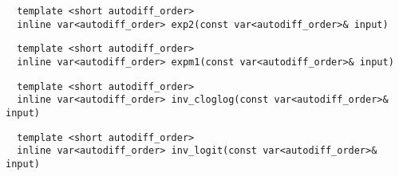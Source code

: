 \begin{tcolorbox}[colback=white,colframe=gray90, coltitle=black,boxrule=3pt,
fonttitle=\bfseries,title=Binary Exponential]

\begin{verbatim}
  template <short autodiff_order>
  inline var<autodiff_order> exp2(const var<autodiff_order>& input)
\end{verbatim}

\end{tcolorbox}

\begin{tcolorbox}[colback=white,colframe=gray90, coltitle=black,boxrule=3pt,
fonttitle=\bfseries,title=Natural Exponential Minus One]

\begin{verbatim}
  template <short autodiff_order>
  inline var<autodiff_order> expm1(const var<autodiff_order>& input)
\end{verbatim}

\end{tcolorbox}

\begin{tcolorbox}[colback=white,colframe=gray90, coltitle=black,boxrule=3pt,
fonttitle=\bfseries,title=Inverse Complementary Log-Log Link Function]

\begin{verbatim}
  template <short autodiff_order>
  inline var<autodiff_order> inv_cloglog(const var<autodiff_order>& input)
\end{verbatim}

\end{tcolorbox}

\begin{tcolorbox}[colback=white,colframe=gray90, coltitle=black,boxrule=3pt,
fonttitle=\bfseries,title=Inverse Logit or Logistic Function]

\begin{verbatim}
  template <short autodiff_order>
  inline var<autodiff_order> inv_logit(const var<autodiff_order>& input) 
\end{verbatim}

\end{tcolorbox}

